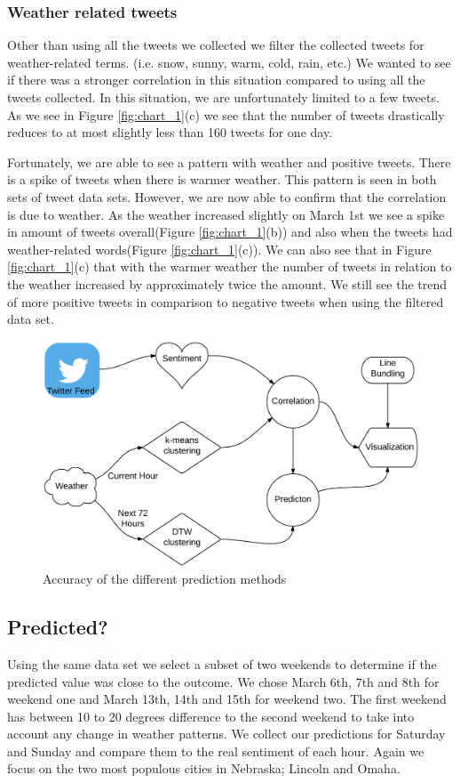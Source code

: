 \documentclass[journal]{vgtc}                %
\begin{document}
\subsubsection{Weather related tweets}
Other than using all the tweets we collected we filter the collected tweets for weather-related terms. (i.e. snow, sunny, warm, cold, rain, etc.) We wanted to see if there was a stronger correlation in this situation compared to using all the tweets collected. In this situation, we are unfortunately limited to a few tweets. As we see in Figure \ref{fig:chart_1}(c) we see that the number of tweets drastically reduces to at most slightly less than 160 tweets for one day. 

Fortunately, we are able to see a pattern with weather and positive tweets. There is a spike of tweets when there is warmer weather. This pattern is seen in both sets of tweet data sets. However, we are now able to confirm that the correlation is due to weather. As the weather increased slightly on March 1st we see a spike in amount of tweets overall(Figure \ref{fig:chart_1}(b)) and also when the tweets had weather-related words(Figure \ref{fig:chart_1}(c)). We can also see that in Figure \ref{fig:chart_1}(c) that with the warmer weather the number of tweets in relation to the weather increased by approximately twice the amount. We still see the trend of more positive tweets in comparison to negative tweets when using the filtered data set.

\begin{figure}[htb]
 \centering
 \includegraphics[scale=0.1]{steps}
 \caption{Accuracy of the different prediction methods}
 \label{fig:predict}
\end{figure}

\subsection{Predicted?}
Using the same data set we select a subset of two weekends to determine if the predicted value was close to the outcome. We chose March 6th, 7th and 8th for weekend one and March 13th, 14th and 15th for weekend two. The first weekend has between 10 to 20 degrees difference to the second weekend to take into account any change in weather patterns. We collect our predictions for Saturday and Sunday and compare them to the real sentiment of each hour. Again we focus on the two most populous cities in Nebraska; Lincoln and Omaha.
\end{document}
